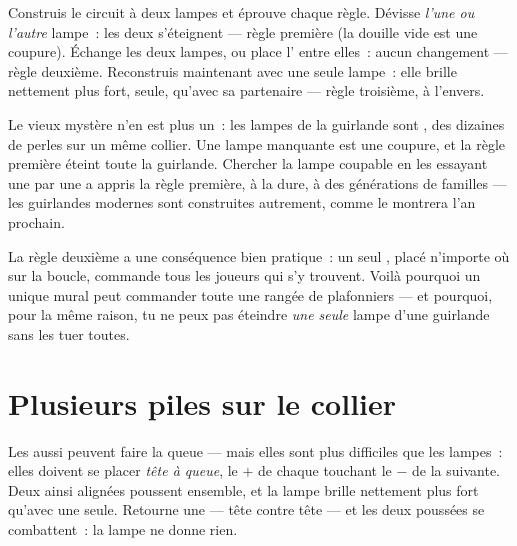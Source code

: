 \begin{example}\label{ex:g4:series-circuits:seeing}
Construis le circuit à deux lampes et éprouve chaque règle. Dévisse
\emph{l'une ou l'autre} lampe~: les deux s'éteignent --- règle
première (la douille vide est une coupure). Échange les deux lampes,
ou place l' entre elles~: aucun changement --- règle
deuxième. Reconstruis maintenant avec une seule lampe~: elle brille
nettement plus fort, seule, qu'avec sa partenaire --- règle
troisième, à l'envers.
\end{example}

\begin{example}\label{ex:g4:series-circuits:partylights}
Le vieux mystère n'en est plus un~: les lampes de la guirlande sont
, des dizaines de perles sur un même collier. Une lampe
manquante est une coupure, et la règle première éteint toute la
guirlande. Chercher la lampe coupable en les essayant une par une a
appris la règle première, à la dure, à des générations de familles
--- les guirlandes modernes sont construites autrement, comme le
montrera l'an prochain.
\end{example}

\begin{remark}\label{rem:g4:series-circuits:switch}
La règle deuxième a une conséquence bien pratique~: un seul
, placé n'importe où sur la boucle, commande tous les
joueurs qui s'y trouvent. Voilà pourquoi un unique  mural
peut commander toute une rangée de plafonniers --- et pourquoi, pour
la même raison, tu ne peux pas éteindre \emph{une seule} lampe d'une
guirlande  sans les tuer toutes.
\end{remark}

\section{Plusieurs piles sur le collier}

\begin{example}\label{ex:g4:series-circuits:batteries}
Les  aussi peuvent faire la queue  --- mais elles sont
plus difficiles que les lampes~: elles doivent se placer \emph{tête à
queue}, le $+$ de chaque  touchant le $-$ de la suivante. Deux
 ainsi alignées poussent ensemble, et la lampe brille nettement
plus fort qu'avec une seule. Retourne une  --- tête contre
tête --- et les deux poussées se combattent~: la lampe ne donne rien.
\end{example}

